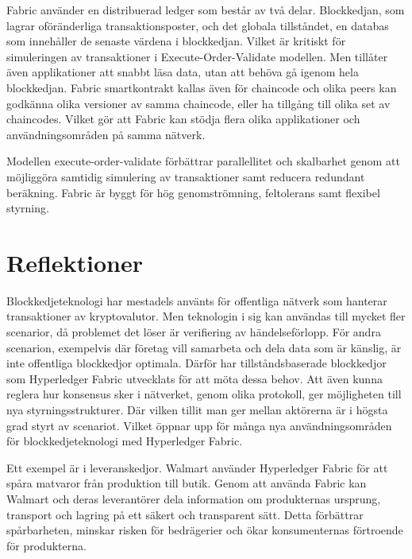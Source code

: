 
Fabric använder en distribuerad ledger som består av två delar. Blockkedjan, som lagrar oföränderliga transaktionsposter, och det globala tillståndet, en databas som innehåller de senaste värdena i blockkedjan. Vilket är kritiskt för simuleringen av transaktioner i Execute-Order-Validate modellen. Men tillåter även applikationer att snabbt läsa data, utan att behöva gå igenom hela blockkedjan. Fabric smartkontrakt kallas även för chaincode och olika peers kan godkänna olika versioner av samma chaincode, eller ha tillgång till olika set av chaincodes. Vilket gör att Fabric kan stödja flera olika applikationer och användningsområden på samma nätverk.



Modellen execute-order-validate förbättrar parallellitet och skalbarhet genom att möjliggöra samtidig simulering av transaktioner samt reducera
redundant beräkning. Fabric är byggt för hög genomströmning, feltolerans samt flexibel styrning.




\section{Reflektioner}
Blockkedjeteknologi har mestadels använts för offentliga nätverk som hanterar transaktioner av kryptovalutor. Men teknologin i sig kan användas till mycket fler scenarior, då problemet det löser är verifiering av händelseförlopp. För andra scenarion, exempelvis där företag vill samarbeta och dela data som är känslig, är inte offentliga blockkedjor optimala. Därför har tillståndsbaserade blockkedjor som Hyperledger Fabric utvecklats för att möta dessa behov. Att även kunna reglera hur konsensus sker i nätverket, genom olika protokoll, ger möjligheten till nya styrningsstrukturer. Där vilken tillit man ger mellan aktörerna är i högsta grad styrt av scenariot. Vilket öppnar upp för många nya användningsområden för blockkedjeteknologi med Hyperledger Fabric.

Ett exempel är i leveranskedjor. Walmart använder Hyperledger Fabric för att spåra matvaror från produktion till butik. Genom att använda Fabric kan Walmart och deras leverantörer dela information om produkternas ursprung, transport och lagring på ett säkert och transparent sätt. Detta förbättrar spårbarheten, minskar risken för bedrägerier och ökar konsumenternas förtroende för produkterna.